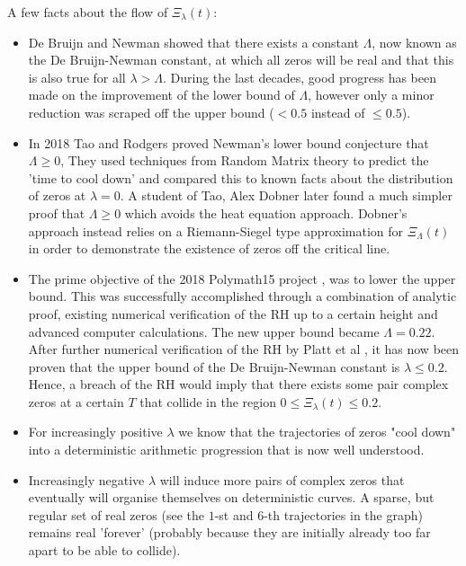 \documentclass[a4paper,11pt,twoside]{amsart}
\newcommand{\verifiedeq}{=}
\newcommand{\verifiedeq}{\stackrel{\checkmark}{=}}
\begin{document}
A few facts about the flow of $\Xi_{\lambda}(t)$:
\begin{itemize}
  \item De Bruijn and Newman showed that there exists a constant $\Lambda$, now known as the De Bruijn-Newman constant, at which all zeros will be real and that this is also true for all $\lambda > \Lambda$. During the last decades, good progress has been made on the improvement of the lower bound of $\Lambda$, however only a minor reduction was scraped off the upper bound ($<0.5$ instead of $\le 0.5$).
  \item In 2018 Tao and Rodgers \cite{rot} proved Newman's lower bound conjecture that $\Lambda \ge 0$, They used techniques from Random Matrix theory to predict the 'time to cool down' and compared this to known facts about the distribution of zeros at $\lambda = 0$. A student of Tao, Alex Dobner later found a much simpler proof \cite{dob} that $\Lambda \ge 0$ which avoids the heat equation approach. Dobner’s approach instead relies on a Riemann-Siegel type approximation for $\Xi_{\Lambda}(t)$ in order to demonstrate the existence of zeros off the critical line.
   \item The prime objective of the 2018 Polymath15 project \cite{pol}, was to lower the upper bound. This was successfully accomplished through a combination of analytic proof, existing numerical verification of the RH up to a certain height and advanced computer calculations. The new upper bound became $\Lambda \verifiedeq 0.22$. After further numerical verification of the RH by Platt et al \cite{pla}, it has now been proven that the upper bound of the De Bruijn-Newman constant is $\lambda \le 0.2$. Hence, a breach of the RH would imply that there exists some pair complex zeros at a certain $T$ that collide in the region $0 \le \Xi_{\lambda}(t) \le 0.2$.
  \item For increasingly positive $\lambda$ we know that the trajectories of zeros "cool down" into a deterministic arithmetic progression that is now well understood.
  \item Increasingly negative $\lambda$ will induce more pairs of complex zeros that eventually will organise themselves on deterministic curves. A sparse, but regular set of real zeros (see the $1$-st and $6$-th trajectories in the graph) remains real 'forever' (probably because they are initially already too far apart to be able to collide). 
\end{itemize}

\pagebreak
\end{document}
